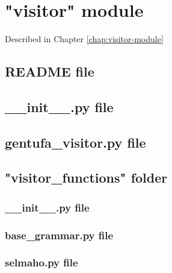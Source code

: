

\chapter{"visitor" module}
\label{appendix:gentufa-visitor-annex}

Described in Chapter \ref{chap:visitor-module}

\section{README file}



\section{\_\_init\_\_.py file}



\section{gentufa\_visitor.py file}



\section{"visitor\_functions" folder}

\subsection{\_\_init\_\_.py file}



\subsection{base\_grammar.py file}



\subsection{selmaho.py file}

